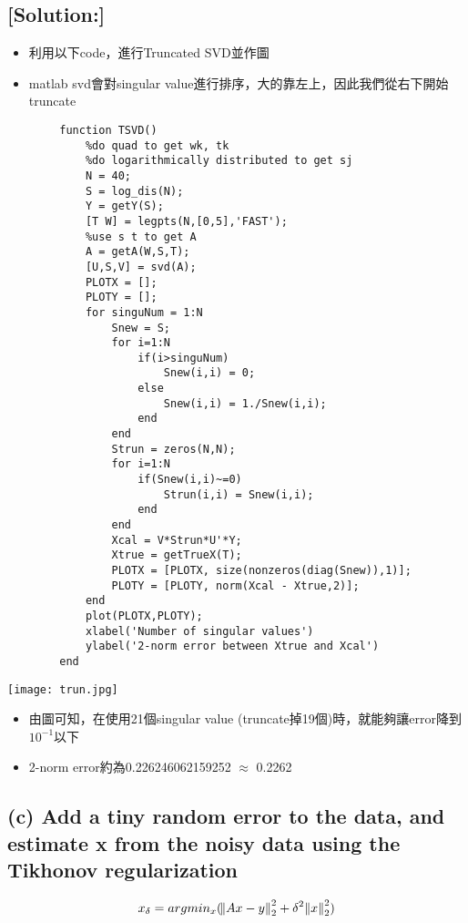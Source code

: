 \documentclass[12pt]{article}
\begin{document}
    \subsection*{[Solution:]}
    \begin{itemize}
        \item 利用以下code，進行Truncated SVD並作圖
        \item matlab svd會對singular value進行排序，大的靠左上，因此我們從右下開始truncate
    \end{itemize}
    \begin{lstlisting}
        function TSVD()
            %do quad to get wk, tk
            %do logarithmically distributed to get sj
            N = 40;
            S = log_dis(N);
            Y = getY(S);
            [T W] = legpts(N,[0,5],'FAST');
            %use s t to get A
            A = getA(W,S,T);
            [U,S,V] = svd(A);
            PLOTX = [];
            PLOTY = [];
            for singuNum = 1:N
                Snew = S;
                for i=1:N 
                    if(i>singuNum)
                        Snew(i,i) = 0;
                    else 
                        Snew(i,i) = 1./Snew(i,i);
                    end
                end
                Strun = zeros(N,N);
                for i=1:N 
                    if(Snew(i,i)~=0)
                        Strun(i,i) = Snew(i,i);
                    end
                end
                Xcal = V*Strun*U'*Y;
                Xtrue = getTrueX(T);
                PLOTX = [PLOTX, size(nonzeros(diag(Snew)),1)];
                PLOTY = [PLOTY, norm(Xcal - Xtrue,2)];
            end
            plot(PLOTX,PLOTY);
            xlabel('Number of singular values')
            ylabel('2-norm error between Xtrue and Xcal')
        end
    \end{lstlisting}
    \texttt{[image: trun.jpg]}
    \begin{itemize}
        \item 由圖可知，在使用21個singular value (truncate掉19個)時，就能夠讓error降到$10^{-1}$以下
        \item 2-norm error約為0.226246062159252 $\approx$ 0.2262
    \end{itemize}
    
    \newpage
    \subsection*{(c) Add a tiny random error to the data, and estimate x from the noisy data using
        the Tikhonov regularization}
            $$x_\delta = argmin_x(\norm{Ax-y}^2_2+\delta^2\norm{x}^2_2)$$
\end{document}
